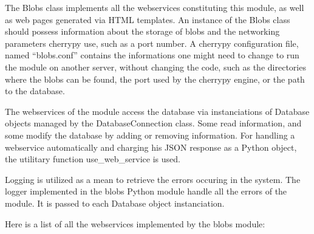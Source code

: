 The Blobs class implements all the webservices constituting this module, as well as web pages generated via HTML templates. An instance of the Blobs class should possess information about the storage of blobs and the networking parameters cherrypy use, such as a port number. A cherrypy configuration file, named ``blobs.conf'' contains the informations one might need to change to run the module on another server, without changing the code, such as the directories where the blobs can be found, the port used by the cherrypy engine, or the path to the database.

The webservices of the module access the database via instanciations of Database objects managed by the DatabaseConnection class. Some read information, and some modify the database by adding or removing information. For handling a webservice automatically and charging his JSON response as a Python object, the utilitary function use\_web\_service is used.

Logging is utilized as a mean to retrieve the errors occuring in the system. The logger implemented in the blobs Python module handle all the errors of the module. It is passed to each Database object instanciation.

Here is a list of all the webservices implemented by the blobs module:

